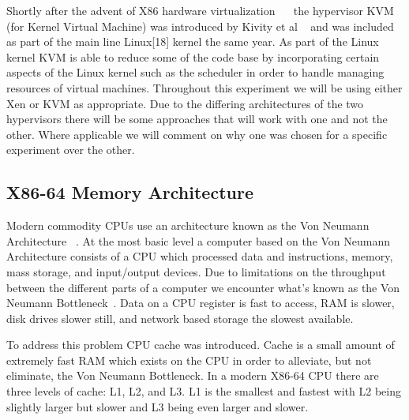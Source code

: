 Shortly after the advent of X86 hardware virtualization ~\cite{neiger_intel_2006}~\cite{codenamed_pacifica_2005} the hypervisor KVM (for Kernel Virtual Machine) was introduced by Kivity et al ~\cite{kivity_kvm:_2007} and was included as part of the main line Linux[18] kernel the same year. As part of the Linux kernel KVM is able to reduce some of the code base by incorporating certain aspects of the Linux kernel such as the scheduler in order to handle managing resources of virtual machines.  Throughout this experiment we will be using either Xen or KVM as appropriate. Due to the differing architectures of the two hypervisors there will be some approaches that will work with one and not the other. Where applicable we will comment on why one was chosen for a specific experiment over the other.





\subsection{X86-64 Memory Architecture}\label{x86mem}

Modern commodity CPUs use an architecture known as the Von Neumann Architecture ~\cite{von_neumann_first_1993}.  At the most basic level a computer based on the Von Neumann Architecture consists of a CPU which processed data and instructions, memory, mass storage, and input/output devices.  Due to limitations on the throughput between the different parts of a computer we encounter what's known as the Von Neumann Bottleneck~\cite{von_neumann_first_1993}.  Data on a CPU register is fast to access, RAM is slower, disk drives slower still, and network based storage the slowest available. 

To address this problem CPU cache was introduced. Cache is a small amount of extremely fast RAM which exists on the CPU in order to alleviate, but not eliminate, the Von Neumann Bottleneck.  In a modern X86-64 CPU there are three levels of cache: L1, L2, and L3. L1 is the smallest and fastest with L2 being slightly larger but slower and L3 being even larger and slower. 

